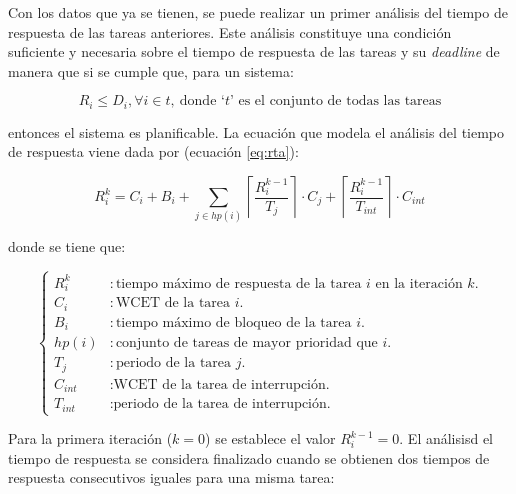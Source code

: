 Con los datos que ya se tienen, se puede realizar un primer análisis del tiempo
de respuesta de las tareas anteriores. Este análisis constituye una condición
suficiente y necesaria sobre el tiempo de respuesta de las tareas y su \textit{deadline}
de manera que si se cumple que, para un sistema:

\begin{equation*}
  R_i \le D_i, \forall i \in t,~\text{donde `$t$' es el conjunto de todas las tareas}
\end{equation*}

entonces el sistema es planificable. La ecuación que modela el análisis del tiempo
de respuesta viene dada por (ecuación \ref{eq:rta}):

\begin{equation}\label{eq:rta}
  R_i^k = C_i + B_i + \sum_{j \in hp\left(i\right)}  \left\lceil \frac{R_i^{k - 1}}{T_j} \right\rceil \cdot C_j + \left\lceil \frac{R_i^{k - 1}}{T_{int}} \right\rceil \cdot C_{int}
\end{equation}

donde se tiene que:

\begin{equation*}
  \left\{\begin{aligned}
    R_i^k            & : \text{tiempo máximo de respuesta de la tarea $i$ en la iteración $k$.} \\
    C_i              & : \text{WCET de la tarea $i$.}                                           \\
    B_i              & : \text{tiempo máximo de bloqueo de la tarea $i$.}                       \\
    hp\left(i\right) & : \text{conjunto de tareas de mayor prioridad que $i$.}                  \\
    T_j              & : \text{periodo de la tarea $j$.}                                        \\
    C_{int}          & : \text{WCET de la tarea de interrupción.}                               \\
    T_{int}          & : \text{periodo de la tarea de interrupción.}
  \end{aligned}\right.
\end{equation*}

Para la primera iteración ($k = 0$) se establece el valor $R_i^{k - 1} = 0$. El análisisd
el tiempo de respuesta se considera finalizado cuando se obtienen dos tiempos de respuesta
consecutivos iguales para una misma tarea:

